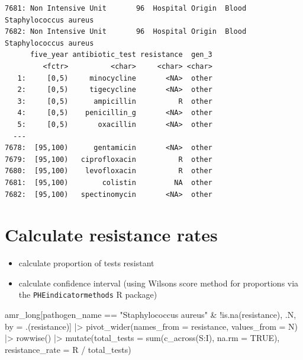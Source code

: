 \documentclass[
  letterpaper,
  DIV=11,
  numbers=noendperiod]{scrreprt}
\newenvironment{Shaded}{\begin{snugshade}}{\end{snugshade}}
\newcommand{\AttributeTok}[1]{\textcolor[rgb]{0.40,0.45,0.13}{#1}}
\newcommand{\ConstantTok}[1]{\textcolor[rgb]{0.56,0.35,0.01}{#1}}
\newcommand{\FunctionTok}[1]{\textcolor[rgb]{0.28,0.35,0.67}{#1}}
\newcommand{\NormalTok}[1]{\textcolor[rgb]{0.00,0.23,0.31}{#1}}
\newcommand{\OtherTok}[1]{\textcolor[rgb]{0.00,0.23,0.31}{#1}}
\newcommand{\SpecialCharTok}[1]{\textcolor[rgb]{0.37,0.37,0.37}{#1}}
\newcommand{\StringTok}[1]{\textcolor[rgb]{0.13,0.47,0.30}{#1}}
\providecommand{\tightlist}{%
  \setlength{\itemsep}{0pt}\setlength{\parskip}{0pt}}\usepackage{longtable,booktabs,array}
\begin{document}
\begin{verbatim}
7681: Non Intensive Unit       96  Hospital Origin  Blood Staphylococcus aureus
7682: Non Intensive Unit       96  Hospital Origin  Blood Staphylococcus aureus
      five_year antibiotic_test resistance  gen_3
         <fctr>          <char>     <char> <char>
   1:     [0,5)     minocycline       <NA>  other
   2:     [0,5)     tigecycline       <NA>  other
   3:     [0,5)      ampicillin          R  other
   4:     [0,5)    penicillin_g       <NA>  other
   5:     [0,5)       oxacillin       <NA>  other
  ---                                            
7678:  [95,100)      gentamicin       <NA>  other
7679:  [95,100)   ciprofloxacin          R  other
7680:  [95,100)    levofloxacin          R  other
7681:  [95,100)        colistin         NA  other
7682:  [95,100)   spectinomycin       <NA>  other
\end{verbatim}

\section{Calculate resistance rates}\label{calculate-resistance-rates}

\begin{itemize}
\tightlist
\item
  calculate proportion of tests resistant
\item
  calculate confidence interval (using Wilsons score method for
  proportions via the \texttt{PHEindicatormethods} R package)
\end{itemize}

\begin{Shaded}
\begin{Highlighting}[]
\NormalTok{amr\_long[pathogen\_name }\SpecialCharTok{==} \StringTok{"Staphylococcus aureus"} \SpecialCharTok{\&} \SpecialCharTok{!}\FunctionTok{is.na}\NormalTok{(resistance), .N, by }\OtherTok{=}\NormalTok{ .(resistance)] }\SpecialCharTok{|\textgreater{}}
    \FunctionTok{pivot\_wider}\NormalTok{(}\AttributeTok{names\_from =}\NormalTok{ resistance, }\AttributeTok{values\_from =}\NormalTok{ N) }\SpecialCharTok{|\textgreater{}}
    \FunctionTok{rowwise}\NormalTok{() }\SpecialCharTok{|\textgreater{}}
    \FunctionTok{mutate}\NormalTok{(}\AttributeTok{total\_tests =} \FunctionTok{sum}\NormalTok{(}\FunctionTok{c\_across}\NormalTok{(S}\SpecialCharTok{:}\NormalTok{I), }\AttributeTok{na.rm =} \ConstantTok{TRUE}\NormalTok{), }
           \AttributeTok{resistance\_rate =}\NormalTok{ R }\SpecialCharTok{/}\NormalTok{ total\_tests)}
\end{Highlighting}
\end{Shaded}
\end{document}
